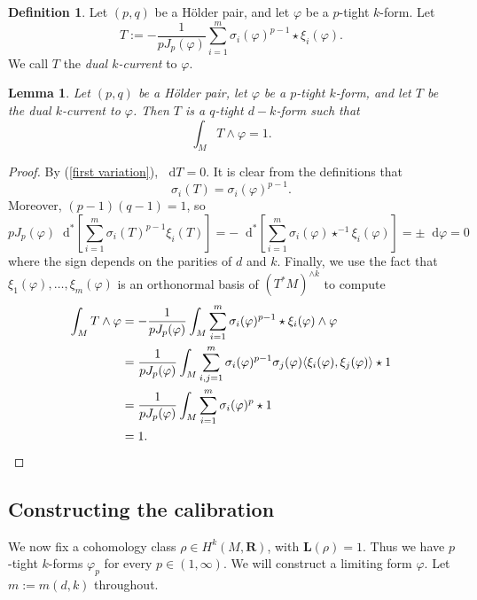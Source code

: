 \documentclass[reqno,11pt]{amsart}
\newcommand{\RR}{\mathbf{R}}
\newcommand*\dif{\mathop{}\!\mathrm{d}}
\newcommand{\Comass}{\mathbf L}
\newcommand{\dfn}[1]{\emph{#1}\index{#1}}
\newtheorem{lemma}[theorem]{Lemma}
\theoremstyle{definition}
\newtheorem{definition}[theorem]{Definition}
\numberwithin{equation}{section}
\begin{document}
\begin{definition}
Let $(p, q)$ be a H\"older pair, and let $\varphi$ be a $p$-tight $k$-form.
Let
$$T := -\frac{1}{p J_p(\varphi)} \sum_{i=1}^m \sigma_i(\varphi)^{p - 1} \star \xi_i(\varphi).$$
We call $T$ the \dfn{dual $k$-current} to $\varphi$.
\end{definition}

\begin{lemma}
Let $(p, q)$ be a H\"older pair, let $\varphi$ be a $p$-tight $k$-form, and let $T$ be the dual $k$-current to $\varphi$.
Then $T$ is a $q$-tight $d - k$-form such that 
\begin{equation}\label{intersection product is 1}
\int_M T \wedge \varphi = 1.
\end{equation}
\end{lemma}
\begin{proof}
By (\ref{first variation}), $\dif T = 0$.
It is clear from the definitions that
$$\sigma_i(T) = \sigma_i(\varphi)^{p - 1}.$$
Moreover, $(p - 1)(q - 1) = 1$, so 
$$p J_p(\varphi) \dif^*\left[\sum_{i=1}^m \sigma_i(T)^{p - 1} \xi_i(T)\right] = -\dif^*\left[\sum_{i=1}^m \sigma_i(\varphi) \star^{-1} \xi_i(\varphi)\right] = \pm \dif \varphi = 0$$
where the sign depends on the parities of $d$ and $k$.
Finally, we use the fact that $\xi_1(\varphi), \dots, \xi_m(\varphi)$ is an orthonormal basis of $(T^* M)^{\wedge k}$ to compute
\begin{align*}
\int_M T \wedge \varphi
&= -\frac{1}{p J_p(\varphi)} \int_M \sum_{i=1}^m \sigma_i(\varphi)^{p - 1} \star \xi_i(\varphi) \wedge \varphi \\
&= \frac{1}{p J_p(\varphi)} \int_M \sum_{i,j=1}^m \sigma_i(\varphi)^{p - 1} \sigma_j(\varphi) \langle\xi_i(\varphi), \xi_j(\varphi)\rangle \star 1 \\
&= \frac{1}{p J_p(\varphi)} \int_M \sum_{i=1}^m \sigma_i(\varphi)^p \star 1 \\
&= 1. \qedhere 
\end{align*}
\end{proof}

\subsection{Constructing the calibration}
We now fix a cohomology class $\rho \in H^k(M, \RR)$, with $\Comass(\rho) = 1$.
Thus we have $p$-tight $k$-forms $\varphi_p$ for every $p \in (1, \infty)$.
We will construct a limiting form $\varphi$.
Let $m := m(d, k)$ throughout.
\end{document}

